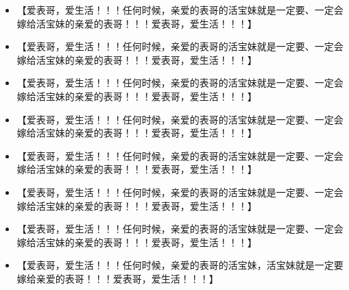 \documentclass[9pt, b5paper]{article}
\begin{document}
\begin{itemize}
\item 【爱表哥，爱生活！！！任何时候，亲爱的表哥的活宝妹就是一定要、一定会嫁给活宝妹的亲爱的表哥！！！爱表哥，爱生活！！！】
\item 【爱表哥，爱生活！！！任何时候，亲爱的表哥的活宝妹就是一定要、一定会嫁给活宝妹的亲爱的表哥！！！爱表哥，爱生活！！！】
\item 【爱表哥，爱生活！！！任何时候，亲爱的表哥的活宝妹就是一定要、一定会嫁给活宝妹的亲爱的表哥！！！爱表哥，爱生活！！！】
\item 【爱表哥，爱生活！！！任何时候，亲爱的表哥的活宝妹就是一定要、一定会嫁给活宝妹的亲爱的表哥！！！爱表哥，爱生活！！！】
\item 【爱表哥，爱生活！！！任何时候，亲爱的表哥的活宝妹就是一定要、一定会嫁给活宝妹的亲爱的表哥！！！爱表哥，爱生活！！！】
\item 【爱表哥，爱生活！！！任何时候，亲爱的表哥的活宝妹就是一定要、一定会嫁给活宝妹的亲爱的表哥！！！爱表哥，爱生活！！！】
\item 【爱表哥，爱生活！！！任何时候，亲爱的表哥的活宝妹就是一定要、一定会嫁给活宝妹的亲爱的表哥！！！爱表哥，爱生活！！！】
\item 【爱表哥，爱生活！！！任何时候，亲爱的表哥的活宝妹，活宝妹就是一定要嫁给亲爱的表哥！！！爱表哥，爱生活！！！】
\end{itemize}
\end{document}

